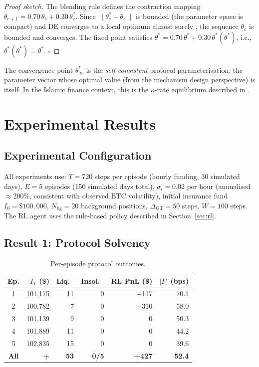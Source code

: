 \documentclass[10pt,twocolumn]{article}
\theoremstyle{plain}
\theoremstyle{definition}
\begin{document}
\begin{proof}[Proof sketch]
The blending rule defines the contraction mapping
$\theta_{e+1} = 0.70\,\theta_e + 0.30\,\theta^*_e$.
Since $\|\theta^*_e - \theta_e\|$ is bounded (the
parameter space is compact) and DE converges to a
local optimum almost surely \cite{Storn1997}, the
sequence $\theta_e$ is bounded and converges.
The fixed point satisfies $\theta^* = 0.70\,\theta^*
+ 0.30\,\theta^*(\theta^*)$, i.e., $\theta^*(\theta^*) = \theta^*$.
\qquad $\square$
\end{proof}

The convergence point $\theta^*_\infty$ is the
\emph{self-consistent} protocol parameterisation: the
parameter vector whose optimal value (from the mechanism
design perspective) is itself.  In the Islamic finance
context, this is the $\kappa$-rate equilibrium described
in \cite{Ahmed2026b}.

\section{Experimental Results}
\label{sec:results}

\subsection{Experimental Configuration}

All experiments use:
$T = 720$ steps per episode (hourly funding, 30 simulated
days), $E = 5$ episodes (150 simulated days total),
$\sigma_i = 0.02$ per hour (annualised $\approx 200\%$,
consistent with observed BTC volatility),
initial insurance fund $I_0 = \$100{,}000$,
$N_{\mathrm{bg}} = 20$ background positions,
$\Delta_{\mathrm{GT}} = 50$ steps, $W = 100$ steps.
The RL agent uses the rule-based policy described in
Section~\ref{sec:rl}.

\subsection{Result 1: Protocol Solvency}

\begin{table}[h!]
\centering
\caption{Per-episode protocol outcomes.}
\label{tab:results_ep}
\small
\begin{tabular}{crrrrr}
\toprule
Ep. & $I_T$ (\$) & Liq.\ & Insol.\ &
RL PnL (\$) & $\overline{|F|}$ (bps) \\
\midrule
1 & 101{,}175 & 11 & 0 & +117 & 70.1 \\
2 & 100{,}782 &  7 & 0 & +310 & 58.0 \\
3 & 101{,}139 &  9 & 0 &    0 & 50.3 \\
4 & 101{,}889 & 11 & 0 &    0 & 44.2 \\
5 & 102{,}835 & 15 & 0 &    0 & 39.6 \\
\midrule
\textbf{All} & \textbf{+} & \textbf{53} &
\textbf{0/5} & \textbf{+427} & \textbf{52.4} \\
\bottomrule
\end{tabular}
\end{table}
\end{document}
